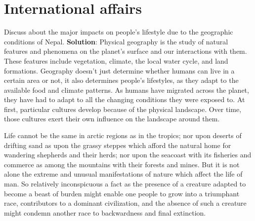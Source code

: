 \documentclass[
]{book}
\newcommand{\question}{\item}
\newenvironment{solution}{ {\bfseries Solution}:}{}
\begin{document}
\hypertarget{international-affairs}{%
\section{International affairs}\label{international-affairs}}

\begin{questions}

\question Discuss about the major impacts on people's lifestyle due to the geographic conditions of Nepal.
\begin{solution}
Physical geography is the study of natural features and phenomena on the planet's surface and our interactions with them. These features include vegetation, climate, the local water cycle, and land formations. Geography doesn't just determine whether humans can live in a certain area or not, it also determines people's lifestyles, as they adapt to the available food and climate patterns. As humans have migrated across the planet, they have had to adapt to all the changing conditions they were exposed to. At first, particular cultures develop because of the physical landscape. Over time, those cultures exert their own influence on the landscape around them.

Life cannot be the same in arctic regions as in the tropics; nor upon deserts of drifting sand as upon the grassy steppes which afford the natural home for wandering shepherds and their herds; nor upon the seacoast with its fisheries and commerce as among the mountains with their forests and mines. But it is not alone the extreme and unusual manifestations of nature which affect the life of man. So relatively inconspicuous a fact as the presence of a creature adapted to become a beast of burden might enable one people to grow into a triumphant race, contributors to a dominant civilization, and the absence of such a creature might condemn another race to backwardness and final extinction.


\end{solution}
\end{questions}
\end{document}
